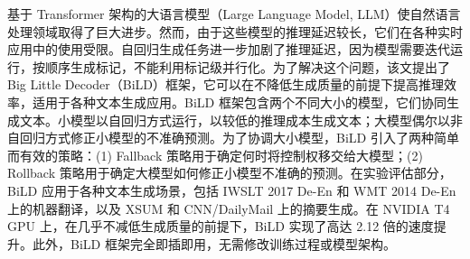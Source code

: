 
\begin{cabstract}
    基于 Transformer 架构的大语言模型（Large Language Model, LLM）使自然语言处理领域取得了巨大进步。然而，由于这些模型的推理延迟较长，它们在各种实时应用中的使用受限。自回归生成任务进一步加剧了推理延迟，因为模型需要迭代运行，按顺序生成标记，不能利用标记级并行化。为了解决这个问题，该文提出了Big Little Decoder（BiLD）框架，它可以在不降低生成质量的前提下提高推理效率，适用于各种文本生成应用。BiLD 框架包含两个不同大小的模型，它们协同生成文本。小模型以自回归方式运行，以较低的推理成本生成文本；大模型偶尔以非自回归方式修正小模型的不准确预测。为了协调大小模型，BiLD 引入了两种简单而有效的策略：(1) Fallback 策略用于确定何时将控制权移交给大模型；(2) Rollback 策略用于确定大模型如何修正小模型不准确的预测。在实验评估部分，BiLD 应用于各种文本生成场景，包括 IWSLT 2017 De-En 和 WMT 2014 De-En 上的机器翻译，以及 XSUM 和 CNN/DailyMail 上的摘要生成。在 NVIDIA T4 GPU 上，在几乎不减低生成质量的前提下，BiLD 实现了高达 2.12 倍的速度提升。此外，BiLD 框架完全即插即用，无需修改训练过程或模型架构。
\end{cabstract}

